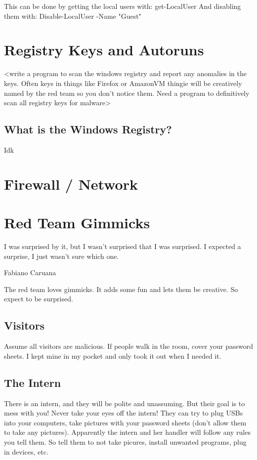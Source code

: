 \documentclass{article}
\begin{document}
This can be done by getting the local users with: get-LocalUser
And disabling them with: Disable-LocalUser -Name "Guest"

\section{Registry Keys and Autoruns}
<write a program to scan the windows registry and report any anomalies in the keys.
Often keys in things like Firefox or AmazonVM thingie will be creatively named by the red team
so you don't notice them. Need a program to definitively scan all registry keys for malware>

\subsection{What is the Windows Registry?}
Idk

\section{Firewall / Network}

\section{Red Team Gimmicks}
\epigraph{I was surprised by it, but I wasn’t surprised that I was surprised. I expected a surprise, I just wasn’t sure which one.}{Fabiano Caruana}

The red team loves gimmicks. It adds some fun and lets them be creative. So expect to be surprised.

\subsection{Visitors}
Assume all visitors are malicious.
If people walk in the room, cover your password sheets. I kept mine in my pocket and only took it out when I needed it. 

\subsection{The Intern}
There is an intern, and they will be polite and unassuming. But their goal is to mess with you! Never take your eyes off the intern!
They can try to plug USBs into your computers, take pictures with your password sheets (don't allow them to take any pictures).
Apparently the intern and her handler will follow any rules you tell them. So tell them to not take picures, install unwanted programs, plug in devices, etc.
\end{document}
